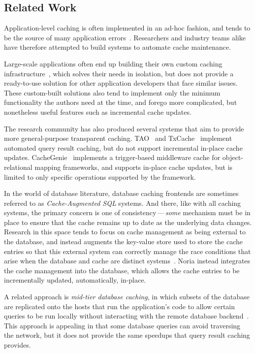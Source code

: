 \subsection*{Related Work}

Application-level caching is often implemented in an ad-hoc fashion, and tends
to be the source of many application errors~\cite{ad-hoc-caching}. Researchers
and industry teams alike have therefore attempted to build systems to automate
cache maintenance.

Large-scale applications often end up building their own custom caching
infrastructure~\cite{facebook-memcache, flannel}, which solves their needs in
isolation, but does not provide a ready-to-use solution for other application
developers that face similar issues. These custom-built solutions also tend to
implement only the minimum functionality the authors need at the time, and
forego more complicated, but nonetheless useful features such as incremental
cache updates.

The research community has also produced several systems that aim to provide
more general-purpose transparent caching. TAO~\cite{tao} and
TxCache~\cite{txcache} implement automated query result caching, but do not
support incremental in-place cache updates. CacheGenie~\cite{cachegenie}
implements a trigger-based middleware cache for object-relational mapping
frameworks, and supports in-place cache updates, but is limited to only specific
operations supported by the framework.

In the world of database literature, database caching frontends are sometimes
referred to as \textit{Cache-Augmented SQL} systems. And there, like with all
caching systems, the primary concern is one of consistency\,---\,\emph{some}
mechanism must be in place to ensure that the cache remains up to date as the
underlying data changes. Research in this space tends to focus on cache
management as being external to the database, and instead augments the key-value
store used to store the cache entries so that this external system can correctly
manage the race conditions that arise when the database and cache are distinct
systems~\cite{facebook-memcache, casql-consistency, casql-consistency-thesis}.
Noria instead integrates the cache management into the database, which allows
the cache entries to be incrementally updated, automatically, in-place.

A related approach is \textit{mid-tier database caching}, in which subsets of
the database are replicated onto the hosts that run the application's code to
allow certain queries to be run locally without interacting with the remote
database backend~\cite{mtcache}. This approach is appealing in that some
database queries can avoid traversing the network, but it does not provide the
same speedups that query result caching provides.


